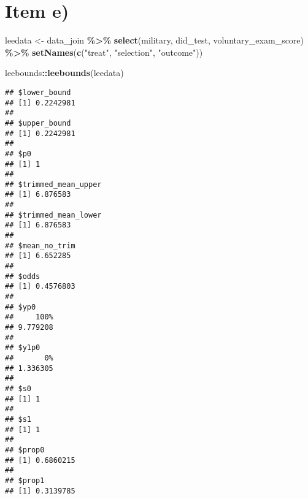 \documentclass[
]{article}
\newenvironment{Shaded}{\begin{snugshade}}{\end{snugshade}}
\newcommand{\FunctionTok}[1]{\textcolor[rgb]{0.13,0.29,0.53}{\textbf{#1}}}
\newcommand{\NormalTok}[1]{#1}
\newcommand{\OtherTok}[1]{\textcolor[rgb]{0.56,0.35,0.01}{#1}}
\newcommand{\SpecialCharTok}[1]{\textcolor[rgb]{0.81,0.36,0.00}{\textbf{#1}}}
\newcommand{\StringTok}[1]{\textcolor[rgb]{0.31,0.60,0.02}{#1}}
\begin{document}
\section{Item e)}\label{item-e-1}

\begin{Shaded}
\begin{Highlighting}[]
\NormalTok{leedata }\OtherTok{\textless{}{-}}\NormalTok{ data\_join }\SpecialCharTok{\%\textgreater{}\%}
  \FunctionTok{select}\NormalTok{(military, did\_test, voluntary\_exam\_score) }\SpecialCharTok{\%\textgreater{}\%}
  \FunctionTok{setNames}\NormalTok{(}\FunctionTok{c}\NormalTok{(}\StringTok{"treat"}\NormalTok{, }\StringTok{"selection"}\NormalTok{, }\StringTok{"outcome"}\NormalTok{))}

\NormalTok{leebounds}\SpecialCharTok{::}\FunctionTok{leebounds}\NormalTok{(leedata)}
\end{Highlighting}
\end{Shaded}

\begin{verbatim}
## $lower_bound
## [1] 0.2242981
## 
## $upper_bound
## [1] 0.2242981
## 
## $p0
## [1] 1
## 
## $trimmed_mean_upper
## [1] 6.876583
## 
## $trimmed_mean_lower
## [1] 6.876583
## 
## $mean_no_trim
## [1] 6.652285
## 
## $odds
## [1] 0.4576803
## 
## $yp0
##     100% 
## 9.779208 
## 
## $y1p0
##       0% 
## 1.336305 
## 
## $s0
## [1] 1
## 
## $s1
## [1] 1
## 
## $prop0
## [1] 0.6860215
## 
## $prop1
## [1] 0.3139785
\end{verbatim}
\end{document}

